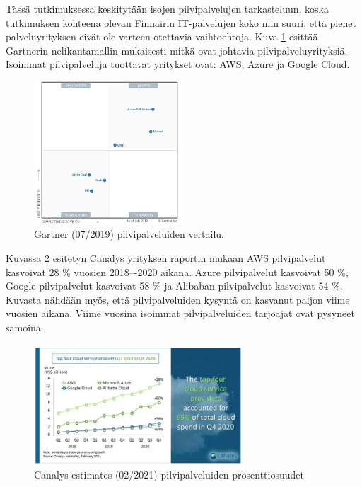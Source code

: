 Tässä tutkimuksessa keskitytään isojen pilvipalvelujen tarkasteluun, koska tutkimuksen kohteena olevan Finnairin IT-palvelujen koko niin suuri, että pienet palveluyrityksen eivät ole varteen otettavia vaihtoehtoja. Kuva \ref{gartner} esittää Gartnerin nelikantamallin mukaisesti mitkä ovat johtavia pilvipalveluyrityksiä. Isoimmat pilvipalveluja tuottavat yritykset ovat: AWS, Azure ja Google Cloud.

\begin{figure}[ht]
\centering 
\includegraphics[width=0.50\textwidth]{figures/CloudIaaS.png}
\caption{Gartner (07/2019) pilvipalveluiden vertailu. \citep{top_cloud}}\label{gartner}
\end{figure}

Kuvassa \ref{canalys} esitetyn Canalys yrityksen raportin mukaan AWS pilvipalvelut kasvoivat 28 \% vuosien 2018–-2020 aikana. Azure pilvipalvelut kasvoivat 50 \%, Google pilvipalvelut kasvoivat 58 \% ja Alibaban pilvipalvelut kasvoivat 54 \%. Kuvasta nähdään myös, että pilvipalveluiden kysyntä on kasvanut paljon viime vuosien aikana. Viime vuosina isoimmat pilvipalveluiden tarjoajat ovat pysyneet samoina.

\begin{figure}[ht]
\centering 
\includegraphics[width=0.70\textwidth]{figures/Canalys.png}
\caption{Canalys estimates (02/2021) pilvipalveluiden prosenttiosuudet \citep{top_cloud}}\label{canalys}
\end{figure}


